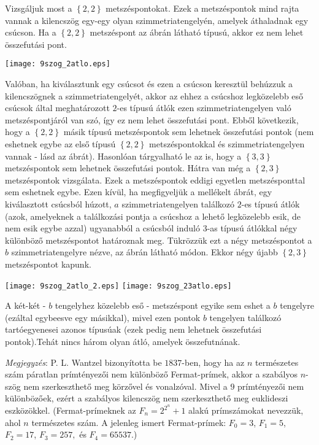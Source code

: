 \documentclass[a4paper,10pt]{article}
\begin{document}
 Vizsgáljuk most a $\left\{
2,2\right\}  $ metszéspontokat. Ezek a metszéspontok mind
rajta vannak a kilencszög egy-egy olyan
szimmetria\-ten\-ge\-lyén, amelyek áthaladnak egy
csúcson. Ha a $\left\{ 2,2\right\} $ metszéspont az
ábrán látható típusú, akkor ez nem lehet
összefutási pont.
\begin{center}
\texttt{[image: 9szog\_2atlo.eps]}
\end{center}
Valóban, ha kiválasztunk egy csúcsot és ezen a
csúcson keresz\-tül behúzzuk a kilencszögnek a
szimmetriatengelyét, akkor az ehhez a csúcshoz
legközelebb eső csúcsok által meghatározott
$2$-es típusú átlók ezen szimmetriatengelyen
való metszéspontjáról van szó, így ez nem
lehet összefutási pont. \newline Ebből következik,
hogy a $\left\{  2,2\right\}  $ másik típusú
metszéspontok sem lehetnek összefutási pontok (nem
eshetnek egybe az első típusú $\left\{  2,2\right\}  $
metszéspontokkal és szimmetriatengelyen vannak - lásd az
ábrát). Hasonlóan tárgyalható le az is, hogy a
$\left\{ 3,3\right\}  $ metszéspontok sem lehetnek
összefutási pontok. Hátra van még a $\left\{
2,3\right\}  $ metszéspontok vizsgálata. Ezek a
metszéspontok eddigi egyetlen metszésponttal sem eshetnek
egybe. Ezen kívül, ha megfigyeljük a mellékelt
ábrát, egy kiválasztott csúcsból húzott, $a$
szim\-met\-riatengelyen találkozó $2$-es típusú
átlók (azok, amelyeknek a talál\-kozási pontja a
csúcshoz a lehető leg\-kö\-ze\-lebb esik, de nem esik
egybe azzal) ugyanabból a csúcsból induló $3$-as
típusú átlókkal négy különböző
metszéspontot határoznak meg. Tükrözzük ezt a
négy metszéspontot a $b$ szimmetriatengelyre nézve, az
ábrán látható módon. Ekkor négy újabb
$\left\{  2,3\right\}  $ metszéspontot kapunk.
\begin{center}
\texttt{[image: 9szog\_2atlo\_2.eps]}\hfill
\texttt{[image: 9szog\_23atlo.eps]}%
\end{center}
A két-két - $b$ tengelyhez közelebb eső -
metszéspont egyike sem eshet a $b$ tengelyre (ezáltal
egybeesve egy másikkal), mivel ezen pontok $b$ tengelyen
találkozó tartóegyenesei azonos típusúak (ezek
pedig nem lehetnek összefutási pontok).\newline Tehát
nincs három olyan átló, amelyek összefutnának.



\textit{Megjegyzés}: P. L. Wantzel bizonyította be $1837$-ben, hogy ha az $n$
természetes szám páratlan prímtényezői nem
különböző Fermat-prímek, akkor a szabályos
$n$-szög nem szer\-keszt\-he\-tő meg körzővel és
vonalzóval. Mivel a $9$ prímtényezői nem
különbözőek, ezért a szabályos
kilencszög nem szerkeszthető meg euklideszi
eszközökkel. (Fermat-prímeknek az $F_{n}=2^{2^{n}}+1$
alakú prímszámokat nevezzük, ahol $n$
természetes szám. A jelenleg ismert Fermat-prímek:
$F_{0}=3$, $F_{1}=5$, $F_{2}=17$, $F_{3}=257,$ és 
$F_{4}=65537.$)
\end{document}
